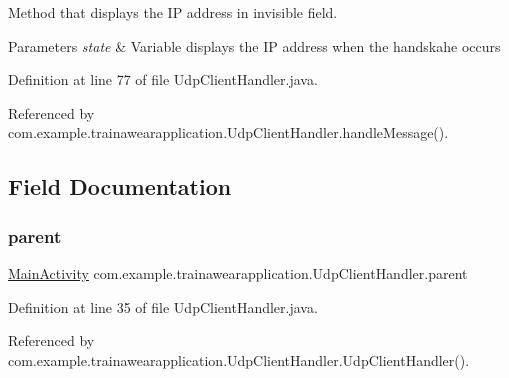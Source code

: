 Method that displays the IP address in invisible field. 


\begin{DoxyParams}{Parameters}
{\em state} & Variable displays the IP address when the handskahe occurs \\
\hline
\end{DoxyParams}


Definition at line 77 of file Udp\+Client\+Handler.\+java.


\begin{DoxyCode}{0}

\end{DoxyCode}


Referenced by com.\+example.\+trainawearapplication.\+Udp\+Client\+Handler.\+handle\+Message().



\subsection{Field Documentation}
\mbox{\label{classcom_1_1example_1_1trainawearapplication_1_1_udp_client_handler_a93942bc64a7d7d570d27c9e485d361e4}} 
\subsubsection{\texorpdfstring{parent}{parent}}
{\footnotesize\ttfamily \mbox{\hyperlink{classcom_1_1example_1_1trainawearapplication_1_1_main_activity}{Main\+Activity}} com.\+example.\+trainawearapplication.\+Udp\+Client\+Handler.\+parent\hspace{0.3cm}{\ttfamily [private]}}



Definition at line 35 of file Udp\+Client\+Handler.\+java.



Referenced by com.\+example.\+trainawearapplication.\+Udp\+Client\+Handler.\+Udp\+Client\+Handler().

